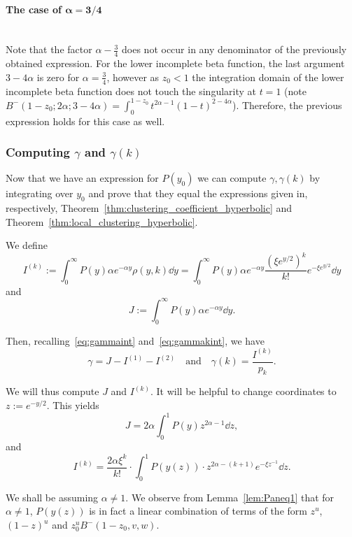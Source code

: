 \paragraph{The case of $\bm{\alpha = 3/4}$}\hfill\\

Note that the factor $\alpha-\frac{3}{4}$ does not occur in any denominator of the previously obtained expression. 
For the lower incomplete beta function, the last argument $3-4\alpha$ is zero for $\alpha=\frac{3}{4}$, however as $z_0 < 1$ the 
integration domain of the lower incomplete beta function does not touch the singularity at $t=1$ 
(note $B^-(1-z_0;2\alpha;3-4\alpha) = \int_0^{1-z_0} t^{2\alpha-1} (1-t)^{2-4\alpha}$). 
Therefore, the previous expression holds for this case as well.





\subsubsection{Computing $\gamma$ and $\gamma(k)$\label{ssec:exact_expressions_clustering_P}}



Now that we have an expression for $P(y_0)$ we can compute $\gamma, \gamma(k)$ by integrating 
over $y_0$ and prove that they equal the expressions given in, respectively, Theorem~\ref{thm:clustering_coefficient_hyperbolic} and 
Theorem~\ref{thm:local_clustering_hyperbolic}.

We define
\[
	I^{(k)} := 
	\int_0^{\infty} P(y) \alpha e^{-\alpha y}\rho(y,k) \dd y = 
	\int_0^{\infty} P(y) \alpha e^{-\alpha y} \frac{\left(\xi e^{y/2}\right)^k}{k!} e^{-\xi e^{y/2}} \dd y
\]
and
\[
	J := \int_0^\infty P(y) \alpha e^{-\alpha y} \dd y.
\]

Then, recalling~\eqref{eq:gammaint} and~\eqref{eq:gammakint}, we have
\[   
	\gamma = J - I^{(1)} - I^{(2)} \quad \text{and} \quad
	\gamma(k) = \frac{I^{(k)}}{p_k}.
\]

We will thus compute $J$ and $I^{(k)}$. It will be helpful to change coordinates to $z := e^{-y/2}$. This yields 
\[ 
	J = 2 \alpha \int_0^1 P(y) z^{2\alpha-1} \dd z, 
\]
and 
\[ 
	I^{(k)} = \frac{2 \alpha \xi^k}{k!} \cdot \int_0^1 P(y(z)) \cdot z^{2\alpha-(k+1)} e^{-\xi z^{-1}} \dd z. 
\]

We shall be assuming $\alpha \not = 1$. 
We observe from Lemma~\ref{lem:Paneq1} that for $\alpha \not =1$, $P(y(z))$ is in fact a linear combination 
of terms of the form $z^u$, $(1-z)^u$ and $z_0^u B^-(1-z_0,v,w)$.

